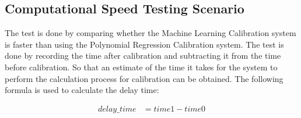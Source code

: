 



\subsection{Computational Speed Testing Scenario}
\label{sec:3}

The test is done by comparing whether the Machine Learning Calibration system is faster than using the Polynomial Regression Calibration system. The test is done by recording the time after calibration and subtracting it from the time before calibration. So that an estimate of the time it takes for the system to perform the calculation process for calibration can be obtained. The following formula is used to calculate the delay time:

\begin{equation}
  \begin{aligned}
    delay\_time &= time1 - time0 \\ 
  \end{aligned}
\end{equation}

